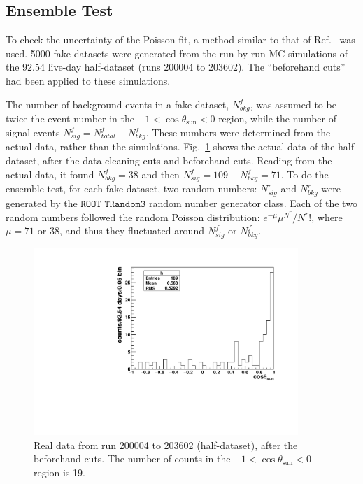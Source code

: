 \subsection{Ensemble Test}\label{sect:ensemble}

To check the uncertainty of the Poisson fit, a method similar to that of Ref.~\cite{leta} was used. 5000 fake datasets were generated from the run-by-run MC simulations of the 92.54 live-day half-dataset (runs 200004 to 203602). The ``beforehand cuts'' had been applied to these simulations.

The number of background events in a fake dataset, $N^f_{bkg}$, was assumed to be twice the event number in the $-1<\cos\theta_\mathrm{sun}<0$ region, while the number of signal events $N^f_{sig}=N^f_{total}-N^f_{bkg}$. These numbers were determined from the actual data, rather than the simulations. Fig.~\ref{half_data} shows the actual data of the half-dataset, after the data-cleaning cuts and beforehand cuts. Reading from the actual data, it found $N^f_{bkg}=38$ and then $N^f_{sig}=109-N^f_{bkg}=71$. To do the ensemble test, for each fake dataset, two random numbers: $N^r_{sig}$ and $N^r_{bkg}$ were generated by the $\texttt{ROOT TRandom3}$ random number generator class. Each of the two random numbers followed the random Poisson distribution: $e^{-\mu}\mu^{N^r}/N^r!$, where $\mu=71$ or $38$, and thus they fluctuated around $N^f_{sig}$ or $N^f_{bkg}$.

\begin{figure}[!htb]
	\centering
	\includegraphics[width=10cm]{cosThetaToSun_halfData_5to15.pdf}
	\caption[Real data from run 200004 to 203602, after the beforehand cuts.]{Real data from run 200004 to 203602 (half-dataset), after the beforehand cuts. The number of counts in the $-1<\cos\theta_\mathrm{sun}<0$ region is 19. \label{half_data}}
\end{figure}

